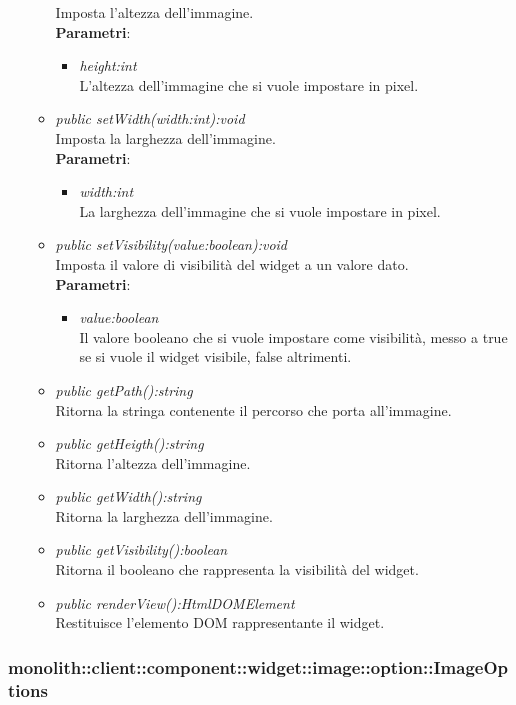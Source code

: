 \begin{itemize}
\begin{itemize}
	Imposta l'altezza dell'immagine.
		\\ \textbf{Parametri}: \begin{itemize}
		\item \textit{height:int}\\
		L'altezza dell'immagine che si vuole impostare in pixel.
		\end{itemize} 
	\item \textit{public setWidth(width:int):void}\\
	Imposta la larghezza dell'immagine.
		\\ \textbf{Parametri}: \begin{itemize}
		\item \textit{width:int}\\
		La larghezza dell'immagine che si vuole impostare in pixel.
		\end{itemize}
	\item \textit{public setVisibility(value:boolean):void}\\
	Imposta il valore di visibilità del widget a un valore dato.
			\\ \textbf{Parametri}: \begin{itemize}
			\item \textit{value:boolean}\\
			Il valore booleano che si vuole impostare come visibilità, messo a true se si vuole il widget visibile, false altrimenti.
		\end{itemize} 
	\item \textit{public getPath():string}\\
	Ritorna la stringa contenente il percorso che porta all'immagine.
	\item \textit{public getHeigth():string}\\
	Ritorna l'altezza dell'immagine.
	\item \textit{public getWidth():string}\\
	Ritorna la larghezza dell'immagine.
	\item \textit{public getVisibility():boolean}\\
	Ritorna il booleano che rappresenta la visibilità del widget.
	\item \textit{public renderView():HtmlDOMElement}\\
	Restituisce l'elemento DOM rappresentante il widget.
	\end{itemize}
\end{itemize}

\subsubsection{monolith::client::component::widget::image::option::ImageOptions}

